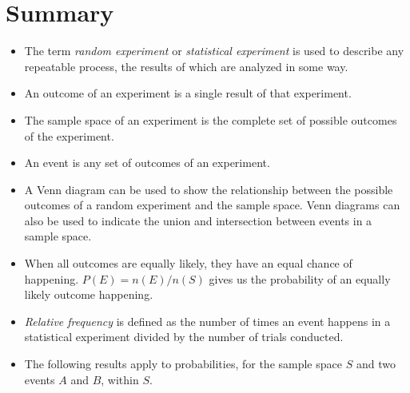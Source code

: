             \section{ Summary}
            \nopagebreak
            \label{m39373*eip-106}\begin{itemize}[noitemsep]
            \item The
term \textsl{random experiment} or \textsl{statistical experiment} is used to describe any
repeatable process, the results of which are analyzed in some way.\item 
An outcome of an experiment is a single result of that experiment.\item 
The sample space of an experiment is the complete set of possible outcomes of
the experiment.\item 
An event is any set of outcomes of an experiment.\item 
A Venn diagram can be used to show the relationship between the possible
outcomes of a random experiment and the sample space. Venn diagrams can also be
used to indicate the union and intersection between events in a sample space.
\item 
When all outcomes are equally likely, they have an equal chance of happening.
\begin{math}P\left(E\right)=n\left(E\right)/n\left(S\right)\end{math} gives us the
probability of an equally likely outcome happening.\item 
\textsl{Relative frequency} is defined as the
number of times an event happens in a statistical experiment divided by the
number of trials conducted.\item The following results apply to probabilities, for the sample space \begin{math}S\end{math} and two events \begin{math}A\end{math} and \begin{math}B\end{math}, within \begin{math}S\end{math}.
      \label{m39373*uid3457}\nopagebreak\noindent{}
    \ifthenelse{\lengthtest{\mymathboxwidth < \columnwidth}}{%
}
\end{itemize}
